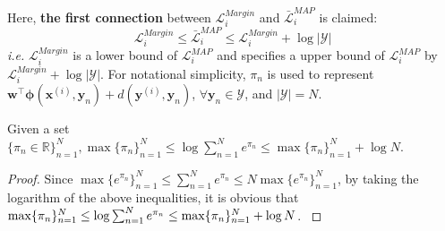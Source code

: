 Here, \textbf{the first connection} between $\mathcal{L}^{Margin}_i$ and $\bar{\mathcal{L}}^{MAP}_i$ is claimed:   
\begin{equation}
    \mathcal{L}^{Margin}_i \leq \bar{\mathcal{L}}^{MAP}_i\leq\mathcal{L}^{Margin}_i+\log |\mathcal{Y}|
    \label{equ:bound}
\end{equation}
\emph{i.e.} $\mathcal{L}^{Margin}_i$  
is a lower bound of $\mathcal{L}^{MAP}_i$ and specifies a upper bound of $\mathcal{L}^{MAP}_i$ by $\mathcal{L}^{Margin}_i+\log |\mathcal{Y}|$. For notational simplicity, $\pi_n$ is used to represent  
$\mathbf{w}^\top \boldsymbol{\phi}(\mathbf{x}^{(i)},\mathbf{y}_n)+d(\mathbf{y}^{(i)},\mathbf{y}_n)$, $\forall \mathbf{y}_n\in\mathcal{Y}$, and $|\mathcal{Y}|=N$. 
\begin{proposition}
    Given a set $\{\pi_n\in\mathbb{R}\}_{n=1}^N, \max\{\pi_n\}_{n=1}^N \leq \log\sum_{n=1}^N e^{\pi_n}\leq \max\{\pi_n\}_{n=1}^N+\log N$. 
\label{pro:bound}
\end{proposition}

\begin{proof}
    Since $\max\{e^{\pi_n}\}_{n=1}^N \leq \sum_{n=1}^N e^{\pi_n}\leq  N \max\{e^{\pi_n}\}_{n=1}^N$, 
    by taking the logarithm of the above inequalities, it is obvious that    
    $\max\{\pi_n\}_{n=1}^N \leq \log\sum_{n=1}^N e^{\pi_n}\leq \max\{\pi_n\}_{n=1}^N\\+\log N$. 
    \label{proof:bound}
\end{proof}

